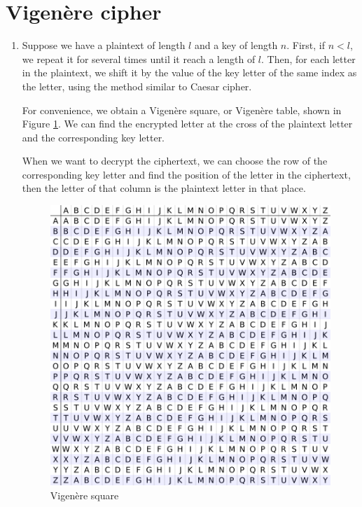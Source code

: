 \documentclass{article}
\begin{document}
\section{Vigenère cipher}
\begin{enumerate}
\item
Suppose we have a plaintext of length $l$ and a key of length $n$. First, if $n<l$, we repeat it for several times until it reach a length of $l$. Then, for each letter in the plaintext, we shift it by the value of the key letter of the same index as the letter, using the method similar to Caesar cipher.

For convenience, we obtain a Vigenère square, or Vigenère table, shown in Figure \ref{vigenere}. We can find the encrypted letter at the cross of the plaintext letter and the corresponding key letter.

When we want to decrypt the ciphertext, we can choose the row of the corresponding key letter and find the position of the letter in the ciphertext, then the letter of that column is the plaintext letter in that place.

\begin{figure}[t]
\centering
\includegraphics[scale=0.4]{vigenere.png}
\caption{Vigenère square}
\label{vigenere}
\end{figure}



\end{enumerate}
\end{document}
